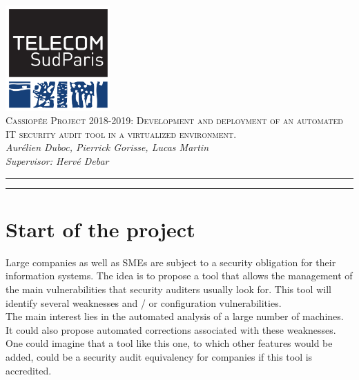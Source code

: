 
\thispagestyle{theme}

\newcolumntype{b}{X}
\usepackage{graphicx,lipsum}


\begin{center}

\includegraphics[width=0.3\textwidth]{images/logo.png} \\ \vspace{0.4cm}
{\huge \textsc{Cassiopée Project 2018-2019: Development and deployment of an automated IT security audit tool in a virtualized environment.}} \\
  \textit{Aurélien Duboc, Pierrick Gorisse, Lucas Martin \\ Supervisor: Hervé Debar}

\end{center}

\noindent\rule{\textwidth}{.1pt}%
\tableofcontents
\noindent\rule{\textwidth}{.1pt}%

\section{Start of the project}

\vspace{1cm}

Large companies as well as SMEs are subject to a security obligation
for their information systems. The idea is to propose a tool that allows the
management of the main vulnerabilities that security auditers usually look for.
This tool will identify several weaknesses and / or configuration vulnerabilities.
\\
The main interest lies in the automated analysis of a large number of machines. 
It could also propose automated corrections associated with these weaknesses. 
One could imagine that a tool like this one, to which other features would be 
added, could be a security audit equivalency for companies 
if this tool is accredited.
\pagebreak

